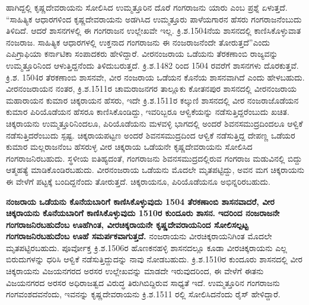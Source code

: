 ಹಾಗಿದ್ದಲ್ಲಿ ಕೃಷ್ಣದೇವರಾಯನು ಸೋಲಿಸಿದ ಉಮ್ಮತ್ತೂರಿನ ದೊರೆ ಗಂಗರಾಜನು ಯಾರು ಎಂಬ ಪ್ರಶ್ನೆ ಏಳುತ್ತದೆ. “ಸಾಹಿತ್ಯಿಕ ಆಧಾರಗಳಿಂದ ಕೃಷ್ಣದೇವರಾಯನು ಅಡಗಿಸಿದ ಉಮ್ಮತ್ತೂರು ಪಾಳೆಯಗಾರನ ಹೆಸರು ಗಂಗರಾಜನೆಂಬುದು ತಿಳಿದಿದೆ. ಆದರೆ ಶಾಸನಗಳಲ್ಲಿ ಈ ಗಂಗರಾಜನ ಉಲ್ಲೇಖವೇ ಇಲ್ಲ. ಕ್ರಿ.ಶ.1504ನೆಯ ಶಾಸನದಲ್ಲಿ ಕಾಣಿಸಿಕೊಳ್ಳುವಾತ ನಂಜರಾಜ. ಸಾಹಿತ್ಯಿಕ ಆಧಾರಗಳಲ್ಲಿ ಉಕ್ತನಾದ ಗಂಗರಾಜನು ಈ ನಂಜರಾಜನೆಂದೇ ತೋರುತ್ತದೆ”ಎಂದು ಎಪಿಗ್ರಾಫಿಯಾ ಕರ್ನಾಟಿಕಾ ಸಂಪಾದಕರು ಹೇಳಿದ್ದಾರೆ. ವೀರನಂಜರಾಯ ಒಡೆಯನು ತೆರಕಣಾಂಬಿ ರಾಜ್ಯವನ್ನು ಉಮ್ಮತ್ತೂರಿನಿಂದ ಆಳುತ್ತಿದ್ದನೆಂದು ತಿಳಿದುಬರುತ್ತದೆ. ಕ್ರಿ.ಶ.1482 ರಿಂದ 1504 ರವರೆಗೆ ಶಾಸನಗಳು ದೊರಕುತ್ತವೆ. ಕ್ರಿ.ಶ. 1504ರ ತೆರಕಣಾಂಬಿ ಶಾಸನವೇ, ವೀರ ನಂಜರಾಯ ಒಡೆಯನ ಕೊನೆಯ ಶಾಸನವಾಗಿದೆ ಎಂದು ಹೇಳಬಹುದು. ವೀರನಂಜರಾಯನ ನಂತರ, ಕ್ರಿ.ಶ.1511ರ ಚಾಮರಾಜನಗರ ತಾಲ್ಲೂಕು ಕೋತನಪುರ ಶಾಸನದಲ್ಲಿ ವೀರನಂಜರಾಯ ಮಹಾರಾಯನ ಕುಮಾರ ಚಿಕ್ಕರಾಯನ ಹೆಸರು, ಇದೇ ಕ್ರಿ.ಶ.1511ರ ಕಲ್ಕುಣಿ ಶಾಸನದಲ್ಲಿ ವೀರ ನಂಜರಾಜೊಡೆಯನ ಕುಮಾರ ಪಿರಿಯೊಡೆಯನ ಹೆಸರೂ ಕಾಣಿಸಿಕೊಂಡಿದ್ದು, ಇವರಿಬ್ಬರೂ ಆಳ್ವಿಕೆಯನ್ನು ನಡೆಸುತ್ತಿದ್ದರೆಂಬುದು ಖಚಿತ. ಚಿಕ್ಕರಾಯನು ಉಮ್ಮತ್ತೂರಿನಿಂದಲೂ, ಪಿರಿಯೊಡೆಯನು ಮಳವಳ್ಳಿ ಭಾಗದಲ್ಲಿ ಅಂದರೆ ಶಿವನಸಮುದ್ರದಿಂದಲೂ ಆಳ್ವಿಕೆ ನಡೆಸುತ್ತಿದರೆಂಬುದು ಸ್ಪಷ್ಟ. ಚಿಕ್ಕರಾಯಪಟ್ಟಣ ಅಂದರೆ ಶಿವನಸಮುದ್ರದಿಂದ ಆಳ್ವಿಕೆ ನಡೆಸುತ್ತಿದ್ದ ದೇಪಣ್ಣ ಒಡೆಯರ ಕುಮಾರ ಮಲ್ಲರಾಜನೆಂಬ ಹೆಸರುಳ್ಳ ವೀರ ಚಿಕ್ಕರಾಯ ಒಡೆಯನೇ ಕೃಷ್ಣದೇವರಾಯನು ಸೋಲಿಸಿದ ಗಂಗರಾಜನಿರಬಹುದು. ಸ್ಥಳೀಯ ಐತಿಹ್ಯದಂತೆ, ಗಂಗರಾಜನು ಶಿವನಸಮುದ್ರ\-ದಲ್ಲಿರುವ ಗಂಗರಾಜ ಮಡುವಿನಲ್ಲಿ ಬಿದ್ದು ಆತ್ಮಹತ್ಯೆ ಮಾಡಿಕೊಂಡಿರಬಹುದು. ವೀರನಂಜರಾಯ ಒಡೆಯನು ಮೊದಲೇ ಮೃತಪಟ್ಟಿದ್ದು, ಅವನ ಮಗ ಚಿಕ್ಕರಾಯನು ಈ ವೇಳೆಗೆ ಪಟ್ಟಕ್ಕೆ ಬಂದಿದ್ದನೆಂದು ತೋರುತ್ತದೆ. ಚಿಕ್ಕರಾಯನೂ, ಪಿರಿಯೊಡೆಯನೂ ಅಭಿನ್ನರಿರಬಹುದು.

\textbf{ನಂಜರಾಯ ಒಡೆಯನು ಕೊನೆಯಬಾರಿಗೆ ಕಾಣಿಸಿಕೊಳ್ಳುವುದು 1504 ತೆರಕಣಾಂಬಿ ಶಾಸನವಾದರೆ, ವೀರ\general{\break } ಚಿಕ್ಕರಾಯನು ಕೊನೆಯಬಾರಿಗೆ ಕಾಣಿಸಿಕೊಳ್ಳುವುದು 1510ರ ಕುಂದೂರು ಶಾಸನ.} \textbf{ಇದರಿಂದ ನಂಜರಾಜನೇ ಗಂಗರಾಜನಿರ\-ಬಹುದೆಂಬ ಊಹೆಗಿಂತ, ವೀರಚಿಕ್ಕರಾಯನೇ ಕೃಷ್ಣದೇವರಾಯನಿಂದ ಸೋಲಿಸಲ್ಪಟ್ಟ ಗಂಗರಾಜನಿರಬಹುದೆಂಬ ಊಹೆ\general{\break } ಸಮರ್ಪಕವಾಗುತ್ತದೆ.} ನಂಜರಾಯನು ವೀರಚಿಕ್ಕರಾಯನಿಗಿಂತ ಮೊದಲೇ ಮೃತಪಟ್ಟಿರಬಹುದು. ಪೂರ್ವೋಕ್ತ ಕ್ರಿ.ಶ.1506ರ ಹೊಣಕನಹಳ್ಳಿ ಶಾಸನದಲ್ಲೂ ಕೂಡಾ ವೀರಚಿಕ್ಕರಾಯನು ಎಲ್ಲ ಬಿರುದುಗಳನ್ನು ಧರಿಸಿ ಆಳ್ವಿಕೆ ನಡೆಸುತ್ತಿದ್ದುದನ್ನು ನಾವು ನೋಡಬಹುದು. ಕ್ರಿ.ಶ.1510ರ ಕುಂದೂರು ಶಾಸನದಲ್ಲಿ ವೀರ ಚಿಕ್ಕರಾಯನು ವಿಜಯನಗರದ ಅರಸರ ಉಲ್ಲೇಖವನ್ನು ಮಾಡದೇ ಇರುವುದರಿಂದ, ಈ ವೇಳೆಗೆ ಈತನು ವಿಜಯನಗರದ ಅರಸರ ಅಧಿರಾಜತ್ವದ ವಿರುದ್ಧ ತಿರುಗಿಬಿದ್ದಿರುವ ಸಾಧ್ಯತೆ ಇದೆ. ಉಮ್ಮತ್ತೂರಿನ ಗಂಗರಾಜನು ಗಂಗವಂಶದವನೆಂದು, ಇವನನ್ನು ಕೃಷ್ಣದೇವರಾಯನು ಕ್ರಿ.ಶ.1511 ರಲ್ಲಿ ಸೋಲಿಸಿದನೆಂದು ರೈಸ್​ ಹೇಳಿದ್ದಾರೆ.

